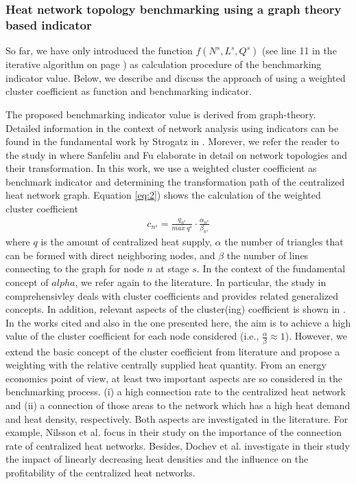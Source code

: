\subsubsection{Heat network topology benchmarking using a graph theory based indicator}\label{bench}
So far, we have only introduced the function $f(N^{s}, L^{s}, Q^{s})$ (see line 11 in the iterative algorithm on page \pageref{Alg:2}) as calculation procedure of the benchmarking indicator value. Below, we describe and discuss the approach of using a weighted cluster coefficient as function and benchmarking indicator.\newline

The proposed benchmarking indicator value is derived from graph-theory. Detailed information in the context of network analysis using indicators can be found in the fundamental work by Strogatz in \cite{strogatz2001exploring}. Morever, we refer the reader to the study in \cite{sanfeliu1983distance} where Sanfeliu and Fu elaborate in detail on network topologies and their transformation. In this work, we use a weighted cluster coefficient as benchmark indicator and determining the transformation path of the centralized heat network graph. Equation \ref{eq:2}) shows the calculation of the weighted cluster coefficient
\begin{align}\label{eq:2}
c_{n^{s}}=\frac{q_{n^{s}}}{max~q^{s}}\cdot \frac{\alpha_{n^{s}}}{\beta_{n^{s}}}
\end{align}
where $q$ is the amount of centralized heat supply, $\alpha$ the number of triangles that can be formed with direct neighboring nodes, and $\beta$ the number of lines connecting to the graph for node $n$ at stage $s$. In the context of the fundamental concept of $alpha$, we refer again to the literature. In particular, the study in \cite{huang2010link} comprehensivley deals with cluster coefficients and provides related generalized concepts. In addition, relevant aspects of the cluster(ing) coefficient is shown in \cite{cui2014detecting}. In the works cited and also in the one presented here, the aim is to achieve a high value of the cluster coefficient for each node considered (i.e., $\frac{\alpha}{\beta} \approx 1$). However, we extend the basic concept of the cluster coefficient from literature and propose a weighting with the relative centrally supplied heat quantity. From an energy economics point of view, at least two important aspects are so considered in the benchmarking process. (i) a high connection rate to the centralized heat network and (ii) a connection of those areas to the network which has a high heat demand and heat density, respectively. Both aspects are investigated in the literature. For example, Nilsson et al. \cite{nilsson2008sparse} focus in their study on the importance of the connection rate of centralized heat networks. Besides, Dochev et al. \cite{dochev2018analysing} investigate in their study the impact of linearly decreasing heat densities and the influence on the profitability of the centralized heat networks.

